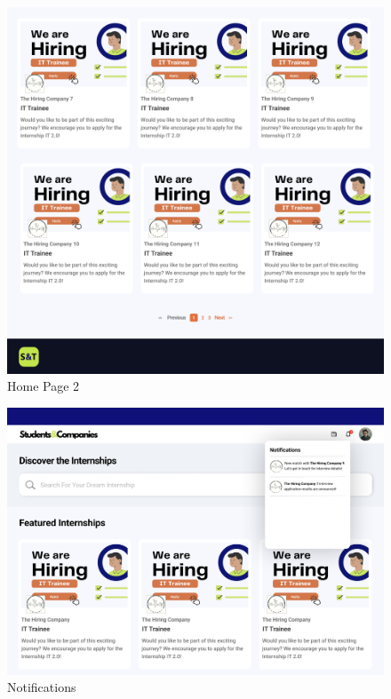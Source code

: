 \documentclass{article}
\begin{document}
\begin{figure}[H]
    \centering
    \includegraphics[scale = 0.40]{figures/UserInterfaces/HomePage2.png}
    \caption{Home Page 2}
     \centering
\end{figure}

\begin{figure}[H]
    \centering
    \includegraphics[scale = 0.40]{figures/UserInterfaces/Notifications.png}
    \caption{Notifications}
     \centering
\end{figure}
\end{document}
